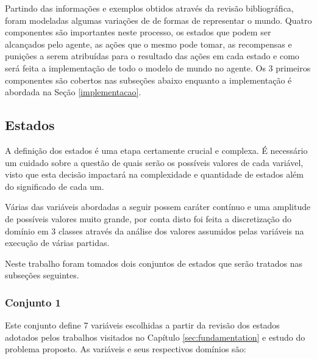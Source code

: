 Partindo das informações e exemplos obtidos através da revisão bibliográfica,
foram modeladas algumas variações de de formas de representar o mundo. Quatro
componentes são importantes neste processo, os estados que podem ser alcançados
pelo agente, as ações que o mesmo pode tomar, as recompensas e punições a serem
atribuídas para o resultado das ações em cada estado e como será feita a
implementação de todo o modelo de mundo no agente. Os 3 primeiros componentes são
cobertos nas subseções abaixo enquanto a implementação é abordada na Seção
\ref{implementacao}.

\subsection{Estados}\label{states}

A definição dos estados é uma etapa certamente crucial e complexa.
É necessário um cuidado sobre a questão de quais serão os possíveis valores
de cada variável, visto que esta decisão impactará na complexidade e
quantidade de estados além do significado de cada um.

Várias das variáveis abordadas a seguir possem
caráter contínuo e uma amplitude de possíveis valores muito grande, por conta
disto foi feita a discretização do domínio em 3 classes através da análise
dos valores assumidos pelas variáveis na execução de várias partidas.

Neste trabalho foram tomados dois conjuntos de estados que serão tratados nas
subseções seguintes.

\subsubsection{Conjunto 1}

Este conjunto define 7 variáveis escolhidas a partir da revisão dos estados
adotados pelos trabalhos visitados no Capítulo \ref{sec:fundamentation} e estudo
do problema proposto. As variáveis e seus respectivos domínios são:

